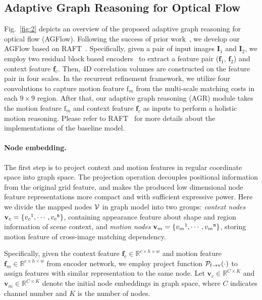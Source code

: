 \documentclass[letterpaper]{article} %
\begin{document}
\subsection{Adaptive Graph Reasoning for Optical Flow}

Fig.~\ref{fig:2} depicts an overview of the proposed adaptive graph reasoning for optical flow (AGFlow). Following the success of prior work~\cite{Jiang2021LearningTE}, we develop our AGFlow based on RAFT~\cite{Teed2020RAFTRA}. Specifically, given a pair of input images ${\mathbf I}_1$ and ${\mathbf I}_2$, we employ two residual block based encoders~\cite{He2016DeepRL} to extract a feature pair (${\mathbf f}_1$, ${\mathbf f}_2$) and context feature ${\mathbf f}_c$. Then, 4D correlation volumes are constructed on the feature pair in four scales. In the recurrent refinement framework, we utilize four convolutions to capture motion feature ${\mathrm f}_m$ from the multi-scale matching costs in each $9 \times 9$ region. After that, our adaptive graph reasoning (AGR) module takes the motion feature ${\mathrm f}_m$ and context feature ${\mathbf f}_c$ as inputs to perform a holistic motion reasoning. Please refer to RAFT~\cite{Teed2020RAFTRA} for more details about the implementations of the baseline model.

\paragraph{Node embedding.} 
The first step is to project context and motion features in regular coordinate space into graph space. The projection operation decouples positional information from the original grid feature, and makes the produced low dimensional node feature representations more compact and with sufficient expressive power. 
Here we divide the mapped nodes $\cal V$ in graph model into two groups: {\em context nodes} ${\mathbf v}_c = \{{v_{c}}^{\tt 1}, \cdots, {v_{c}}^{\tt n}\}$, containing appearance feature about shape and region information of scene context, and {\em motion nodes} ${\mathbf v}_m = \{{v_{m}}^{\tt 1}, \cdots, {v_{m}}^{\tt n}\}$, storing motion feature of cross-image matching dependency.

Specifically, given the context feature ${\mathbf f}_c \in \mathbb{R}^{c \times h \times w}$ and motion feature ${\mathbf f}_m \in \mathbb{R}^{c \times h \times w}$ from encoder network, we employ project function ${\cal P}_{{\mathrm f}\rightarrow {\mathrm v}}(\cdot)$ to assign features with similar representation to the same node. Let ${\mathbf v}_c \in \mathbb{R}^{C \times K}$ and ${\mathbf v}_m \in \mathbb{R}^{C \times K}$ denote the initial node embeddings in graph space, where $C$ indicates channel number and $K$ is the number of nodes. 
\end{document}
